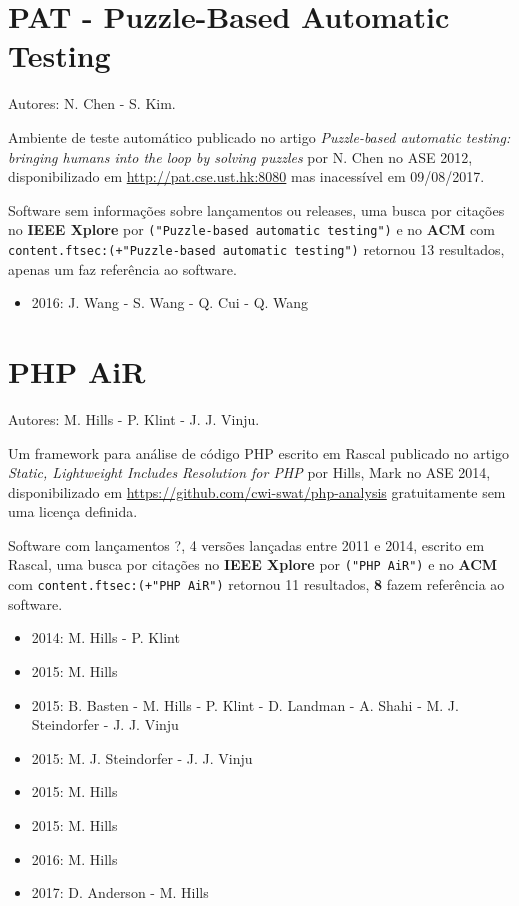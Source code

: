 \section{PAT - Puzzle-Based Automatic Testing}

Autores:
N. Chen - S. Kim.

Ambiente de teste automático
publicado no artigo {\it Puzzle-based automatic testing: bringing humans into the loop by solving puzzles}
por N. Chen
no ASE 2012,
disponibilizado em \url{http://pat.cse.ust.hk:8080}
mas inacessível em 09/08/2017.

Software sem informações sobre lançamentos ou releases,
uma busca por citações no {\bf IEEE Xplore} por
\texttt{("Puzzle-based automatic testing")}
e no {\bf ACM} com
\texttt{content.ftsec:(+"Puzzle-based automatic testing")}
retornou
13 resultados,
apenas um faz referência ao software.

\begin{itemize}
\item 2016: J. Wang - S. Wang - Q. Cui - Q. Wang
\end{itemize}

\section{PHP AiR}

Autores:
M. Hills - P. Klint - J. J. Vinju.

Um framework para análise de código PHP escrito em Rascal
publicado no artigo {\it Static, Lightweight Includes Resolution for PHP}
por Hills, Mark
no ASE 2014,
disponibilizado em \url{https://github.com/cwi-swat/php-analysis}
gratuitamente
sem uma licença definida.

Software com lançamentos ?,
4 versões lançadas
entre 2011 e 2014,
escrito em Rascal,
uma busca por citações no {\bf IEEE Xplore} por
\texttt{("PHP AiR")}
e no {\bf ACM} com
\texttt{content.ftsec:(+"PHP AiR")}
retornou
11 resultados,
{\bf 8} fazem referência ao software.

\begin{itemize}
\item 2014: M. Hills - P. Klint
\item 2015: M. Hills
\item 2015: B. Basten - M. Hills - P. Klint - D. Landman - A. Shahi - M. J. Steindorfer - J. J. Vinju
\item 2015: M. J. Steindorfer - J. J. Vinju
\item 2015: M. Hills
\item 2015: M. Hills
\item 2016: M. Hills
\item 2017: D. Anderson - M. Hills
\end{itemize}

